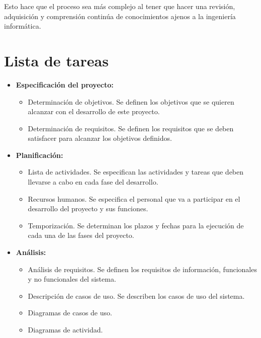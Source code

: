 Esto hace que el proceso sea más complejo al tener que hacer una revisión, adquisición y comprensión continúa de conocimientos ajenos a la ingeniería informática. 

\section{Lista de tareas}

\begin{itemize}
	\item \textbf{Especificación del proyecto:}
	\begin{itemize}
		\item Determinación de objetivos. Se definen los objetivos que se quieren alcanzar con el desarrollo de este proyecto.
		\item Determinación de requisitos. Se definen los requisitos que se deben satisfacer para alcanzar los objetivos definidos.
	\end{itemize}
\end{itemize}

\bigskip

\begin{itemize}
	\item \textbf{Planificación:}
	\begin{itemize}
		\item Lista de actividades. Se especifican las actividades y tareas que deben llevarse a cabo en cada fase del desarrollo.
		\item Recursos humanos. Se especifica el personal que va a participar en el desarrollo del proyecto y sus funciones.
		\item Temporización. Se determinan los plazos y fechas para la ejecución de cada una de las fases del proyecto.
	\end{itemize}
\end{itemize}

\bigskip

\begin{itemize}
	\item \textbf{Análisis:}
	\begin{itemize}
		\item Análisis de requisitos. Se definen los requisitos de información, funcionales y no funcionales del sistema.
		\item Descripción de casos de uso. Se describen los casos de uso del sistema.
		\item Diagramas de casos de uso. 
		\item Diagramas de actividad.
	\end{itemize}
\end{itemize}


